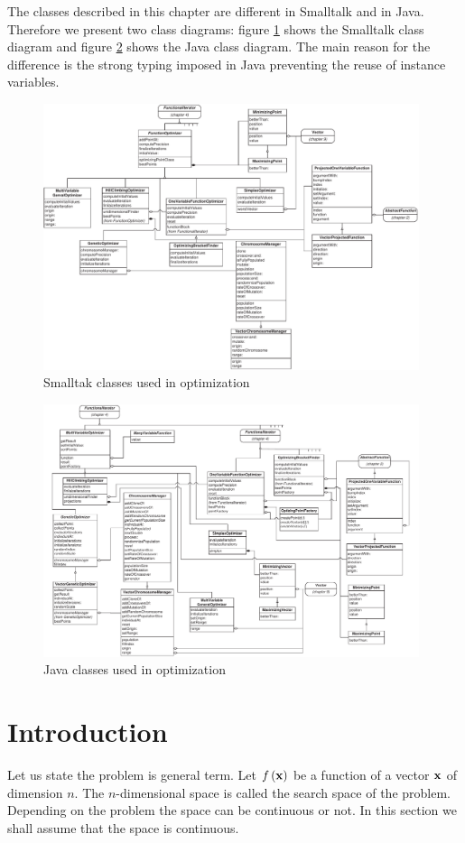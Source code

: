 \documentclass[twoside]{book}
\begin{document}
The classes described in this chapter are different in Smalltalk
and in Java. Therefore we present two class diagrams: figure
\ref{fig:soptimizingclasses} shows the Smalltalk class diagram and
figure \ref{fig:joptimizingclasses} shows the Java class diagram.
The main reason for the difference is the strong typing imposed in
Java preventing the reuse of instance variables.
\begin{figure}
\centering\includegraphics[width=11cm]{Figures/Optimizing}
\caption{Smalltak classes used in optimization}
\label{fig:soptimizingclasses}
\end{figure}
\begin{figure}
\centering\includegraphics[width=11cm]{Figures/OptimizingJ}
\caption{Java classes used in optimization}
\label{fig:joptimizingclasses}
\end{figure}


\section{Introduction}
\label{sec:optimum} Let us state the problem is general term. Let
$f\left({\bf x}\right)$ be a function of a vector ${\bf x}$ of
dimension $n$. The $n$-dimensional space is called the search
space of the problem. Depending on the problem the space can be
continuous or not. In this section we shall assume that the space
is continuous.
\end{document}
